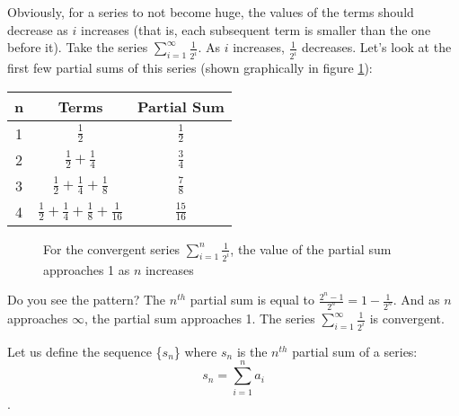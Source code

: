 Obviously, for a series to not become huge, the values of the terms 
should decrease as $i$ increases (that is, each subsequent term is 
smaller than the one before it). Take the series $\sum_{i=1}^\infty 
\frac{1}{2^i}$. As $i$ increases, $\frac{1}{2^i}$ decreases. Let's 
look at the first few partial sums of this series (shown graphically 
in figure \ref{fig:convsum}):
\begin{center}
\begin{tabular}{|c|c|c|}\hline
n & Terms & Partial Sum\\
\hline
1 & $\frac{1}{2}$ & $\frac{1}{2}$\\
\hline
2 & $\frac{1}{2} + \frac{1}{4}$ & $\frac{3}{4}$\\
\hline
3 & $\frac{1}{2} + \frac{1}{4} + \frac{1}{8}$ & $\frac{7}{8}$\\
\hline
4 & $\frac{1}{2} + \frac{1}{4} + \frac{1}{8} + \frac{1}{16}$ & 
$\frac{15}{16}$\\
\hline
\end{tabular}
\end{center}

\begin{figure}[htbp]
\centering
    \caption{For the convergent series $\sum_{i=1}^n \frac{1}{2^i}$, 
    the value of the partial sum approaches 1 as $n$ increases}
    \label{fig:convsum}
\end{figure}

Do you see the pattern? The $n^{th}$ partial sum is equal to 
$\frac{2^n - 1}{2^n} = 1 - \frac{1}{2^n}$. And as $n$ approaches 
$\infty$, the partial sum approaches 1. The series $\sum_{i=1}^\infty 
\frac{1}{2^i}$ is convergent. 

Let us define the sequence \{$s_n$\} where $s_n$ is the $n^{th}$ 
partial sum of a series:
$$s_n = \sum_{i=1}^n a_i$$. 

